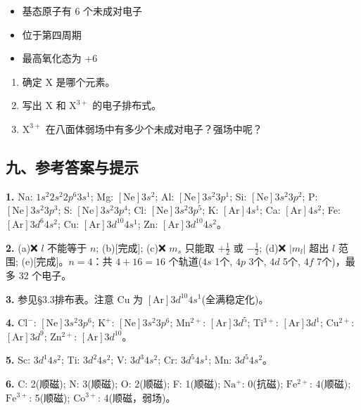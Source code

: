 \documentclass[a4paper,11pt]{ctexart}
\providecommand{\tightlist}{\setlength{\itemsep}{0pt}\setlength{\parskip}{0pt}}
\newcommand{\箭}{\ensuremath{\rightarrow}}
\newcommand{\左箭}{\ensuremath{\leftarrow}}
\newcommand{\上箭}{\ensuremath{\uparrow}}
\newcommand{\下箭}{\ensuremath{\downarrow}}
\newcommand{\衡}{\ensuremath{\rightleftharpoons}}
\newcommand{\双箭}{\ensuremath{\leftrightarrow}}
\newcommand{\约等于}{\ensuremath{\approx}}
\newcommand{\小于等于}{\ensuremath{\leq}}
\newcommand{\大于等于}{\ensuremath{\geq}}
\newcommand{\不等于}{\ensuremath{\neq}}
\newcommand{\西格马}{\ensuremath{\sigma}}
\newcommand{\派}{\ensuremath{\pi}}
\begin{document}
\begin{enumerate}
  \begin{itemize}
  \tightlist
  \item
    基态原子有 6 个未成对电子
  \item
    位于第四周期
  \item
    最高氧化态为 +6
  \end{itemize}

  \begin{enumerate}
  \def\labelenumii{(\alph{enumii})}
  \tightlist
  \item
    确定 X 是哪个元素。
  \item
    写出 \(\mathrm{X}\) 和 \(\mathrm{X^{3+}}\) 的电子排布式。
  \item
    \(\mathrm{X^{3+}}\) 在八面体弱场中有多少个未成对电子？强场中呢？
  \end{enumerate}
\end{enumerate}

\subsection{九、参考答案与提示}\label{ux4e5dux53c2ux8003ux7b54ux6848ux4e0eux63d0ux793a}

\textbf{1.} Na: \(1s^2 2s^2 2p^6 3s^1\); Mg: \([\mathrm{Ne}]3s^2\); Al: \([\mathrm{Ne}]3s^2 3p^1\); Si: \([\mathrm{Ne}]3s^2 3p^2\); P: \([\mathrm{Ne}]3s^2 3p^3\); S: \([\mathrm{Ne}]3s^2 3p^4\); Cl: \([\mathrm{Ne}]3s^2 3p^5\); K: \([\mathrm{Ar}]4s^1\); Ca: \([\mathrm{Ar}]4s^2\); Fe: \([\mathrm{Ar}]3d^6 4s^2\); Cu: \([\mathrm{Ar}]3d^{10} 4s^1\); Zn: \([\mathrm{Ar}]3d^{10} 4s^2\)。

\textbf{2.} (a)❌ \(l\) 不能等于 \(n\); (b){[}完成{]}; (c)❌ \(m_s\) 只能取 \(+\frac{1}{2}\) 或 \(-\frac{1}{2}\); (d)❌ \(|m_l|\) 超出 \(l\) 范围; (e){[}完成{]}。\(n=4\)：共 \(4+16=16\) 个轨道(\(4s\) 1个, \(4p\) 3个, \(4d\) 5个, \(4f\) 7个)，最多 32 个电子。

\textbf{3.} 参见§3.3排布表。注意 Cu 为 \([\mathrm{Ar}]3d^{10}4s^1\)(全满稳定化)。

\textbf{4.} \(\mathrm{Cl^-}\): \([\mathrm{Ne}]3s^2 3p^6\); \(\mathrm{K^+}\): \([\mathrm{Ne}]3s^2 3p^6\); \(\mathrm{Mn^{2+}}\): \([\mathrm{Ar}]3d^5\); \(\mathrm{Ti^{3+}}\): \([\mathrm{Ar}]3d^1\); \(\mathrm{Cu^{2+}}\): \([\mathrm{Ar}]3d^9\); \(\mathrm{Zn^{2+}}\): \([\mathrm{Ar}]3d^{10}\)。

\textbf{5.} Sc: \(3d^1 4s^2\); Ti: \(3d^2 4s^2\); V: \(3d^3 4s^2\); Cr: \(3d^5 4s^1\); Mn: \(3d^5 4s^2\)。

\textbf{6.} C: 2(顺磁); N: 3(顺磁); O: 2(顺磁); F: 1(顺磁); \(\mathrm{Na^+}\): 0(抗磁); \(\mathrm{Fe^{2+}}\): 4(顺磁); \(\mathrm{Fe^{3+}}\): 5(顺磁); \(\mathrm{Co^{3+}}\): 4(顺磁，弱场)。
\end{document}
